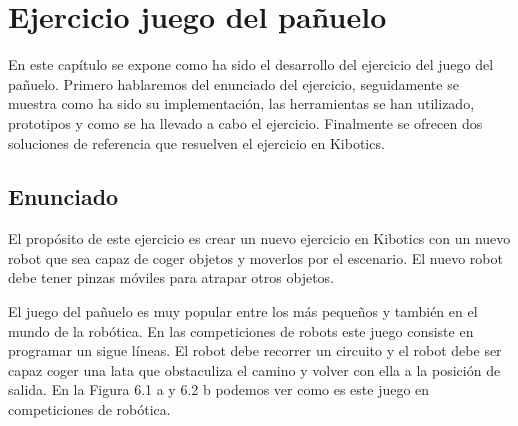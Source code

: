 \chapter{Ejercicio juego del pañuelo} \label{gripper}
En este capítulo se expone como ha sido el desarrollo del ejercicio del juego del pañuelo. Primero hablaremos del enunciado del ejercicio, seguidamente se muestra como ha sido su implementación, las herramientas se han utilizado, prototipos y como se ha llevado a cabo el ejercicio. Finalmente se ofrecen dos soluciones de referencia que resuelven el ejercicio en Kibotics.

\section{Enunciado}
El propósito de este ejercicio es crear un nuevo ejercicio en Kibotics con un nuevo robot que sea capaz de coger objetos y moverlos por el escenario. El nuevo robot debe tener pinzas móviles para atrapar otros objetos. 

El juego del pañuelo es muy popular entre los más pequeños y también en el mundo de la robótica. En las competiciones de robots este juego consiste en programar un sigue líneas. El robot debe recorrer un circuito y el robot debe ser capaz coger una lata que obstaculiza el camino  y volver con ella a la posición de salida. En la Figura 6.1 a y 6.2 b podemos ver como es este juego en competiciones de robótica.

